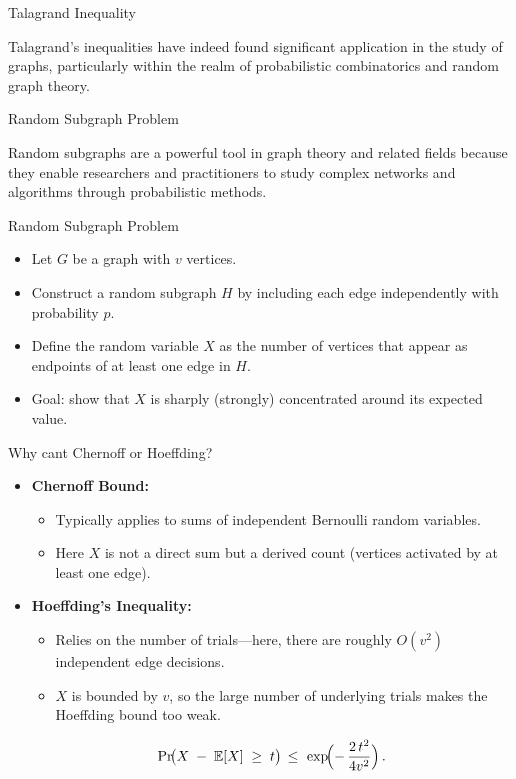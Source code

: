 \documentclass[aspectratio=169, handout]{beamer}
\begin{document}
\begin{frame}{Talagrand Inequality}
  \begin{itemize}
    Talagrand’s inequalities have indeed found significant application in the study of graphs, particularly within the realm of probabilistic combinatorics and random graph theory.  
  \end{itemize}
\end{frame}

\begin{frame}{Random Subgraph Problem}
  \begin{itemize}
    Random subgraphs are a powerful tool in graph theory and related fields because they enable researchers and practitioners to study complex networks and algorithms through probabilistic methods.
  \end{itemize}
\end{frame}

\begin{frame}{Random Subgraph Problem}
  \begin{itemize}
    \item Let \(G\) be a graph with \(v\) vertices.
    \item Construct a random subgraph \(H\) by including each edge independently with probability \(p\).
    \item Define the random variable \(X\) as the number of vertices that appear as endpoints of at least one edge in \(H\).
    \item Goal:  show that  \(X\)  is sharply (strongly) concentrated around its expected value. 
  \end{itemize}
\end{frame}


\begin{frame}{Why cant Chernoff or Hoeffding?}
  \begin{itemize}
    \item \textbf{Chernoff Bound:}
      \begin{itemize}
        \item Typically applies to sums of independent Bernoulli random variables.
        \item Here \(X\) is not a direct sum but a derived count (vertices activated by at least one edge).
      \end{itemize}
    \item \textbf{Hoeffding's Inequality:}
      \begin{itemize}
        \item Relies on the number of trials—here, there are roughly \(O(v^2)\) independent edge decisions.
        \item \(X\) is bounded by \(v\), so the large number of underlying trials makes the Hoeffding bound too weak.
      \end{itemize}
    \[
    \Pr\!\bigl(  X \;-\; \mathbb{E}[X] \;\ge\; t \bigr)
    \,\le\, 
     \,\exp\!\Bigl(-\,\frac{2\,t^2}{4v^2}\Bigr)\,.
    \]
  \end{itemize}
\end{frame}
\end{document}
